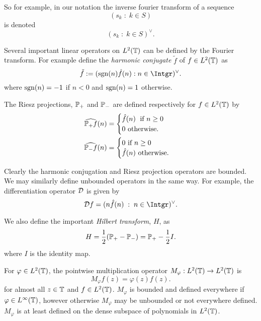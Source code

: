 \documentclass{unswmaths}
\begin{document}
So for example, in our notation the inverse fourier transform of a sequence
\begin{equation*}
    (s_k\;:\;k \in S)
\end{equation*}
is denoted
\begin{equation*}
    (s_k\;:\;k \in S)^\vee.
\end{equation*}

Several important linear operators on $L^2(\mathbb{T})$ can be defined by the Fourier
transform. For example define the \emph{harmonic conjugate} $\tilde{f}$ of $f \in L^2(\mathbb{T})$ as
\begin{equation*}
    \tilde{f} := (\sgn(n)\hat{f}(n):n \in \Intgr)^{\vee}.
\end{equation*}
where $\operatorname{sgn}(n) = -1$ if $n < 0$ and $\operatorname{sgn}(n) = 1$ otherwise.


The Riesz projections, $\mathbb{P}_+$ and $\mathbb{P}_-$ are defined respectively for $f \in L^2(\mathbb{T})$ by
\begin{align*}
        \widehat{\mathbb{P}_+ f}(n) &= \begin{cases} \hat{f}(n)\;\text{ if }n \geq 0\\
        0\text{ otherwise.}\\
   \end{cases}\\
   \widehat{\mathbb{P}_- f}(n) &= \begin{cases} 0\text{ if }n \geq 0\\
        \hat{f}(n)\text{ otherwise.}\\
   \end{cases}
\end{align*}

Clearly the harmonic conjugation and Riesz projection operators are bounded. We may similarly
define unbounded operators in the same way. For example, the differentiation operator $\mathcal{D}$ is given by
\begin{equation*}
    \Diff f = (n\hat{f}(n)\;:\;n \in \Intgr)^\vee.
\end{equation*}

We also define the important \emph{Hilbert transform}, $H$, as
\begin{equation*}
    H = \frac{1}{2}(\mathbb{P}_+-\mathbb{P}_-) = \mathbb{P}_+-\frac{1}{2}I.
\end{equation*}
where $I$ is the identity map.

For $\varphi \in L^2(\mathbb{T})$, the pointwise multiplication operator $M_\varphi:L^2(\mathbb{T})\rightarrow L^2(\mathbb{T})$
is
\begin{equation*}
    M_\varphi f(z) = \varphi(z)f(z).
\end{equation*}
for almost all $z \in \mathbb{T}$ and $f \in L^2(\mathbb{T})$. $M_\varphi$ is bounded and defined everywhere if $\varphi \in L^\infty(\mathbb{T})$, however
otherwise $M_\varphi$ may be unbounded or not everywhere defined. $M_\varphi$ is at least defined on the dense subspace
of polynomials in $L^2(\mathbb{T})$. 
\end{document}

